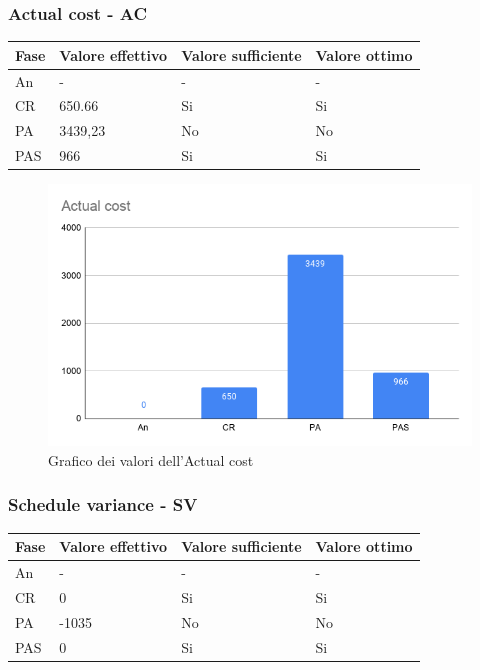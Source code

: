 \subsubsection{Actual cost - AC}

\begin{longtabu} to \textwidth {| X[0.1,c m] | X[0.1,c m] | X[0.1,c m] | X[0.1,c m] |}
    \hline
    \textbf{Fase} &
    \textbf{Valore effettivo} & 
    \textbf{Valore sufficiente} & 
    \textbf{Valore ottimo} \\
    \hline
    An & - & - & - \\
    \hline
    CR & 650.66 & Si & Si \\ 
    \hline    
    PA & 3439,23 & No & No \\
    \hline 
    PAS & 966 & Si & Si \\
    \hline
    \end{longtabu}

    \begin{figure}[H]
        \centering
        \includegraphics[width=10 cm]{source/sections/images/actual_cost.png}
        \caption{Grafico dei valori dell'Actual cost}
    \end{figure}

\subsubsection{Schedule variance - SV}

\begin{longtabu} to \textwidth {| X[0.1,c m] | X[0.1,c m] | X[0.1,c m] | X[0.1,c m]|}
    \hline
    \textbf{Fase} &
    \textbf{Valore effettivo} & 
    \textbf{Valore sufficiente} & 
    \textbf{Valore ottimo} \\
    \hline
    An & - & - & - \\
    \hline
    CR & 0 & Si & Si \\ 
    \hline
    PA & -1035 & No & No \\
    \hline 
    PAS & 0 & Si & Si \\
    \hline
    \end{longtabu}

